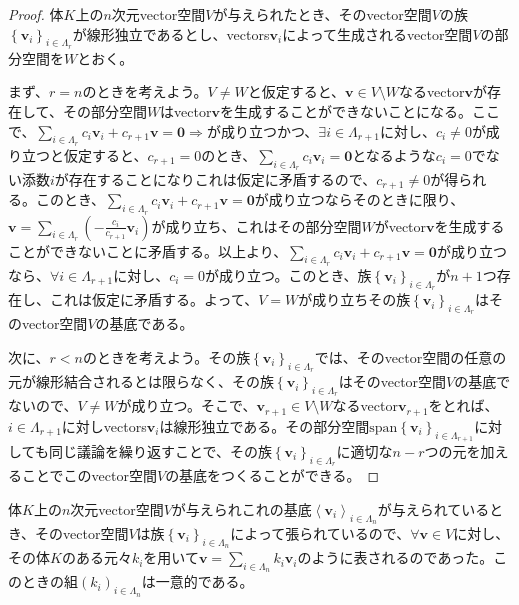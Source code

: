 \documentclass[dvipdfmx]{jsarticle}
\begin{document}
\begin{proof}
体$K$上の$n$次元vector空間$V$が与えられたとき、そのvector空間$V$の族$\left\{ \mathbf{v}_{i} \right\}_{i \in \varLambda_{r}} $が線形独立であるとし、vectors$\mathbf{v}_{i}$によって生成されるvector空間$V$の部分空間を$W$とおく。\par
まず、$r = n$のときを考えよう。$V \neq W$と仮定すると、$\mathbf{v} \in V \setminus W$なるvector$\mathbf{v}$が存在して、その部分空間$W$はvector$\mathbf{v}$を生成することができないことになる。ここで、$\sum_{i \in \varLambda_{r}} {c_{i}\mathbf{v}_{i}} + c_{r + 1}\mathbf{v} = \mathbf{0} \Rightarrow$が成り立つかつ、$\exists i \in \varLambda_{r + 1}$に対し、$c_{i} \neq 0$が成り立つと仮定すると、$c_{r + 1} = 0$のとき、$\sum_{i \in \varLambda_{r}} {c_{i}\mathbf{v}_{i}} = \mathbf{0}$となるような$c_{i} = 0$でない添数$i$が存在することになりこれは仮定に矛盾するので、$c_{r + 1} \neq 0$が得られる。このとき、$\sum_{i \in \varLambda_{r}} {c_{i}\mathbf{v}_{i}} + c_{r + 1}\mathbf{v} = \mathbf{0}$が成り立つならそのときに限り、$\mathbf{v} = \sum_{i \in \varLambda_{r}} \left( - \frac{c_{i}}{c_{r + 1}}\mathbf{v}_{i} \right)$が成り立ち、これはその部分空間$W$がvector$\mathbf{v}$を生成することができないことに矛盾する。以上より、$\sum_{i \in \varLambda_{r}} {c_{i}\mathbf{v}_{i}} + c_{r + 1}\mathbf{v} = \mathbf{0}$が成り立つなら、$\forall i \in \varLambda_{r + 1}$に対し、$c_{i} = 0$が成り立つ。このとき、族$\left\{ \mathbf{v}_{i} \right\}_{i \in \varLambda_{r}} $が$n + 1$つ存在し、これは仮定に矛盾する。よって、$V = W$が成り立ちその族$\left\{ \mathbf{v}_{i} \right\}_{i \in \varLambda_{r}} $はそのvector空間$V$の基底である。\par
次に、$r < n$のときを考えよう。その族$\left\{ \mathbf{v}_{i} \right\}_{i \in \varLambda_{r}} $では、そのvector空間の任意の元が線形結合されるとは限らなく、その族$\left\{ \mathbf{v}_{i} \right\}_{i \in \varLambda_{r}} $はそのvector空間$V$の基底でないので、$V \neq W$が成り立つ。そこで、$\mathbf{v}_{r + 1} \in V \setminus W$なるvector$\mathbf{v}_{r + 1}$をとれば、$i \in \varLambda_{r + 1}$に対しvectors$\mathbf{v}_{i}$は線形独立である。その部分空間${\mathrm{span}}\left\{ \mathbf{v}_{i} \right\}_{i \in \varLambda_{r + 1}}$に対しても同じ議論を繰り返すことで、その族$\left\{ \mathbf{v}_{i} \right\}_{i \in \varLambda_{r}} $に適切な$n - r$つの元を加えることでこのvector空間$V$の基底をつくることができる。
\end{proof}
\begin{thm}\label{2.1.1.21}
体$K$上の$n$次元vector空間$V$が与えられこれの基底$\left\langle \mathbf{v}_{i} \right\rangle_{i \in \varLambda_{n}}$が与えられているとき、そのvector空間$V$は族$\left\{ \mathbf{v}_{i} \right\}_{i \in \varLambda_{n}} $によって張られているので、$\forall\mathbf{v} \in V$に対し、その体$K$のある元々$k_{i}$を用いて$\mathbf{v} = \sum_{i \in \varLambda_{n}} {k_{i}\mathbf{v}_{i}}$のように表されるのであった。このときの組$\left( k_{i} \right)_{i \in \varLambda_{n}}$は一意的である。
\end{thm}\par
\end{document}
